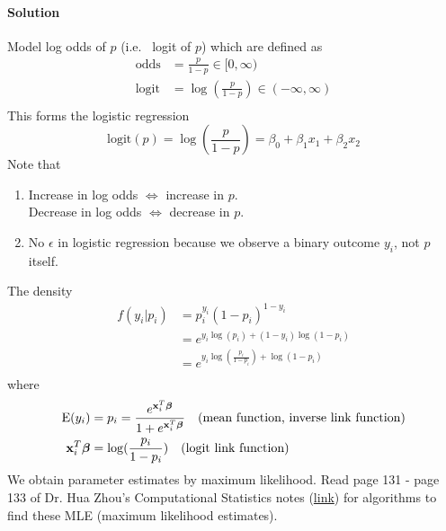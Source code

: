 \paragraph{Solution}
Model log odds of $p$ (i.e.~ logit of $p$) which are defined as
$$
\begin{aligned}
	\mbox{odds} &= \frac{p}{1 - p} \in [0, \infty)\\
	\mbox{logit} &= \log(\frac{p}{1 - p}) \in (-\infty, \infty)\\
\end{aligned}
$$
This forms the logistic regression
$$
\mbox{logit}(p) = \log(\frac{p}{1 - p}) = \beta_0 + \beta_1 x_1 + \beta_2 x_2
$$
Note that 
\begin{enumerate}
	\item Increase in log odds $\iff$ increase in $p$.\\
	Decrease in log odds $\iff$ decrease in $p$.
	\item No $\epsilon$ in logistic regression because we observe a binary outcome $y_i$, not $p$ itself.	
\end{enumerate}

The density
$$
\begin{aligned}
f(y_i | p_i) &= p_i^{y_i} (1 - p_i)^{1 - y_i}\\
&= e^{y_i \log(p_i) + ( 1 - y_i)\log(1 - p_i)}\\
&= e^{y_i \log(\frac{p_i}{1 - p_i}) + \log(1 - p_i)}\\
\end{aligned}
$$
where 
$$
\begin{aligned}
\mbox{E}(y_i) &= p_i = \frac{e^{\mathbf{x}_i^T\boldsymbol{\beta}}}{1 + e^{\mathbf{x}_i^T\boldsymbol{\beta}}} \quad (\mbox{mean function, inverse link function})\\
\mathbf{x}_i^T \boldsymbol{\beta} &= \log(\frac{p_i}{1 - p_i}) \quad (\mbox{logit link function})\\
\end{aligned}
$$
We obtain parameter estimates by maximum likelihood.  Read page 131 - page 133 of Dr. Hua Zhou's Computational Statistics notes  (\href{http://hua-zhou.github.io/teaching/st758-2014fall/ST758-2014-Fall-LecNotes.pdf}{link}) for algorithms to find these MLE (maximum likelihood estimates).






























